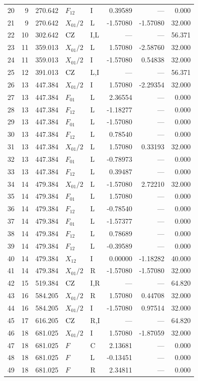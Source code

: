 {\begin{longtable}{@{}rrrllrrr@{}}
20 & 9 & 270.642 & $F_{12}$ & I & 0.39589 & --- & 0.000\\
21 & 9 & 270.642 & $X_{01}/2$ & L & -1.57080 & -1.57080 & 32.000\\
22 & 10 & 302.642 & $\mathrm{CZ}$ & I,L & --- & --- & 56.371\\
23 & 11 & 359.013 & $X_{01}/2$ & L & 1.57080 & -2.58760 & 32.000\\
24 & 11 & 359.013 & $X_{01}/2$ & I & -1.57080 & 0.54838 & 32.000\\
25 & 12 & 391.013 & $\mathrm{CZ}$ & L,I & --- & --- & 56.371\\
26 & 13 & 447.384 & $X_{01}/2$ & I & 1.57080 & -2.29354 & 32.000\\
27 & 13 & 447.384 & $F_{01}$ & L & 2.36554 & --- & 0.000\\
28 & 13 & 447.384 & $F_{12}$ & L & -1.18277 & --- & 0.000\\
29 & 13 & 447.384 & $F_{01}$ & L & -1.57080 & --- & 0.000\\
30 & 13 & 447.384 & $F_{12}$ & L & 0.78540 & --- & 0.000\\
31 & 13 & 447.384 & $X_{01}/2$ & L & 1.57080 & 0.33193 & 32.000\\
32 & 13 & 447.384 & $F_{01}$ & L & -0.78973 & --- & 0.000\\
33 & 13 & 447.384 & $F_{12}$ & L & 0.39487 & --- & 0.000\\
34 & 14 & 479.384 & $X_{01}/2$ & L & -1.57080 & 2.72210 & 32.000\\
35 & 14 & 479.384 & $F_{01}$ & L & 1.57080 & --- & 0.000\\
36 & 14 & 479.384 & $F_{12}$ & L & -0.78540 & --- & 0.000\\
37 & 14 & 479.384 & $F_{01}$ & L & -1.57377 & --- & 0.000\\
38 & 14 & 479.384 & $F_{12}$ & L & 0.78689 & --- & 0.000\\
39 & 14 & 479.384 & $F_{12}$ & L & -0.39589 & --- & 0.000\\
40 & 14 & 479.384 & $X_{12}$ & I & 0.00000 & -1.18282 & 40.000\\
41 & 14 & 479.384 & $X_{01}/2$ & R & -1.57080 & -1.57080 & 32.000\\
42 & 15 & 519.384 & $\mathrm{CZ}$ & I,R & --- & --- & 64.820\\
43 & 16 & 584.205 & $X_{01}/2$ & R & 1.57080 & 0.44708 & 32.000\\
44 & 16 & 584.205 & $X_{01}/2$ & I & -1.57080 & 0.97514 & 32.000\\
45 & 17 & 616.205 & $\mathrm{CZ}$ & R,I & --- & --- & 64.820\\
46 & 18 & 681.025 & $X_{01}/2$ & I & 1.57080 & -1.87059 & 32.000\\
47 & 18 & 681.025 & $F$ & C & 2.13681 & --- & 0.000\\
48 & 18 & 681.025 & $F$ & L & -0.13451 & --- & 0.000\\
49 & 18 & 681.025 & $F$ & R & 2.34811 & --- & 0.000\\
\end{longtable}}
